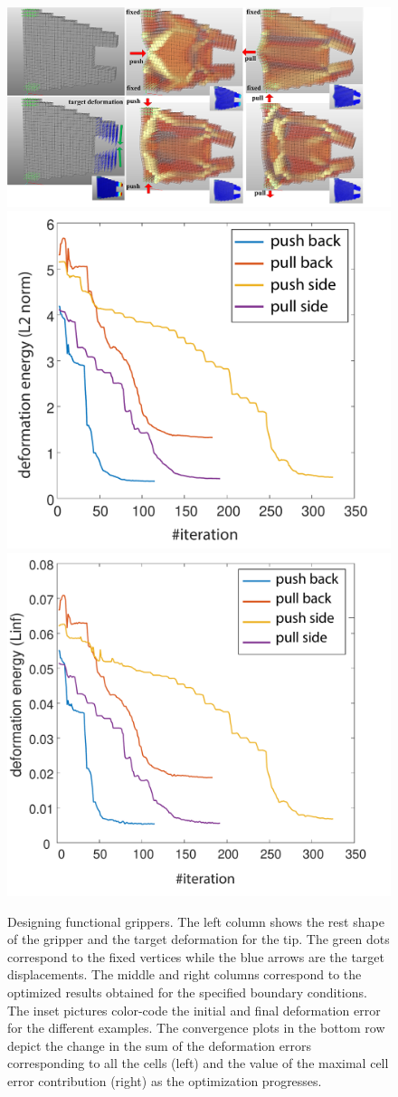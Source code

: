 \begin{figure}
	\centering
	\includegraphics[width=0.9\linewidth]{images/gripperVar.png}
	\includegraphics[width=0.4\linewidth]{images/gripper4_L2.pdf}
	\includegraphics[width=0.4\linewidth]{images/gripper4_Linf.pdf}
	\caption{Designing functional grippers. The left column shows the rest shape of the gripper and the target deformation for the tip.
	The green dots correspond to the fixed vertices while the blue arrows are the target displacements.
	The middle and right columns correspond to the optimized results obtained for the specified boundary conditions.
	The inset pictures color-code the initial and final deformation error for the different examples.
	The convergence plots in the bottom row depict the change in the sum of the deformation errors corresponding to all the cells (left) and the value of the maximal cell error contribution (right) as the optimization progresses.}  
	\label{fig:gripper}
\end{figure}
